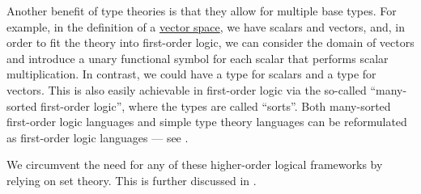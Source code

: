\begin{remark}
  Another benefit of type theories is that they allow for multiple base types. For example, in the definition of a \hyperref[def:vector_space]{vector space}, we have scalars and vectors, and, in order to fit the theory into first-order logic, we can consider the domain of vectors and introduce a unary functional symbol for each scalar that performs scalar multiplication. In contrast, we could have a type for scalars and a type for vectors. This is also easily achievable in first-order logic via the so-called \enquote{many-sorted first-order logic}, where the types are called \enquote{sorts}. Both many-sorted first-order logic languages and simple type theory languages can be reformulated as first-order logic languages --- see \cite[ch. 8]{Farmer2008}.

  We circumvent the need for any of these higher-order logical frameworks by relying on set theory. This is further discussed in .
\end{remark}
